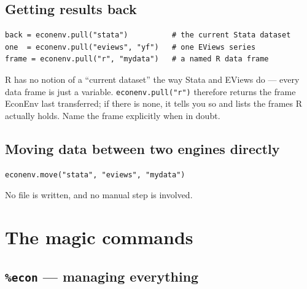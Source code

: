 \documentclass[11pt,a4paper]{report}
\begin{document}
\section{Getting results back}

\begin{lstlisting}
back = econenv.pull("stata")          # the current Stata dataset
one  = econenv.pull("eviews", "yf")   # one EViews series
frame = econenv.pull("r", "mydata")   # a named R data frame
\end{lstlisting}

\begin{warn}
R has no notion of a ``current dataset'' the way Stata and EViews do --- every
data frame is just a variable. \texttt{econenv.pull("r")} therefore returns the
frame EconEnv last transferred; if there is none, it tells you so and lists the
frames R actually holds. Name the frame explicitly when in doubt.
\end{warn}

\section{Moving data between two engines directly}

\begin{lstlisting}
econenv.move("stata", "eviews", "mydata")
\end{lstlisting}

No file is written, and no manual step is involved.

\chapter{The magic commands}

\section{\texttt{\%econ} --- managing everything}
\end{document}
